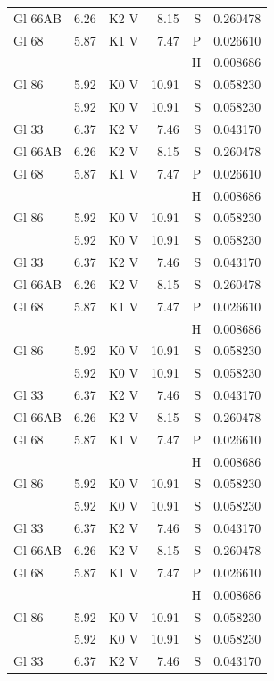 \documentclass{aa}
\begin{document}
{\begin{longtable}{lllrrr}
Gl 66AB  & 6.26 & K2 V & 8.15 & S & 0.260478\\
Gl 68    & 5.87 & K1 V & 7.47 & P & 0.026610\\
         &      &      &      & H & 0.008686\\
Gl 86    & 5.92 & K0 V & 10.91& S & 0.058230\\            & 5.92 & K0 V & 10.91& S & 0.058230\\
Gl 33    & 6.37 & K2 V & 7.46 & S & 0.043170\\
Gl 66AB  & 6.26 & K2 V & 8.15 & S & 0.260478\\
Gl 68    & 5.87 & K1 V & 7.47 & P & 0.026610\\
         &      &      &      & H & 0.008686\\
Gl 86    & 5.92 & K0 V & 10.91& S & 0.058230\\            & 5.92 & K0 V & 10.91& S & 0.058230\\
Gl 33    & 6.37 & K2 V & 7.46 & S & 0.043170\\
Gl 66AB  & 6.26 & K2 V & 8.15 & S & 0.260478\\
Gl 68    & 5.87 & K1 V & 7.47 & P & 0.026610\\
         &      &      &      & H & 0.008686\\
Gl 86    & 5.92 & K0 V & 10.91& S & 0.058230\\            & 5.92 & K0 V & 10.91& S & 0.058230\\
Gl 33    & 6.37 & K2 V & 7.46 & S & 0.043170\\
Gl 66AB  & 6.26 & K2 V & 8.15 & S & 0.260478\\
Gl 68    & 5.87 & K1 V & 7.47 & P & 0.026610\\
         &      &      &      & H & 0.008686\\
Gl 86    & 5.92 & K0 V & 10.91& S & 0.058230\\            & 5.92 & K0 V & 10.91& S & 0.058230\\
Gl 33    & 6.37 & K2 V & 7.46 & S & 0.043170\\
Gl 66AB  & 6.26 & K2 V & 8.15 & S & 0.260478\\
Gl 68    & 5.87 & K1 V & 7.47 & P & 0.026610\\
         &      &      &      & H & 0.008686\\
Gl 86    & 5.92 & K0 V & 10.91& S & 0.058230\\            & 5.92 & K0 V & 10.91& S & 0.058230\\
Gl 33    & 6.37 & K2 V & 7.46 & S & 0.043170\\

\end{longtable}}
\end{document}
